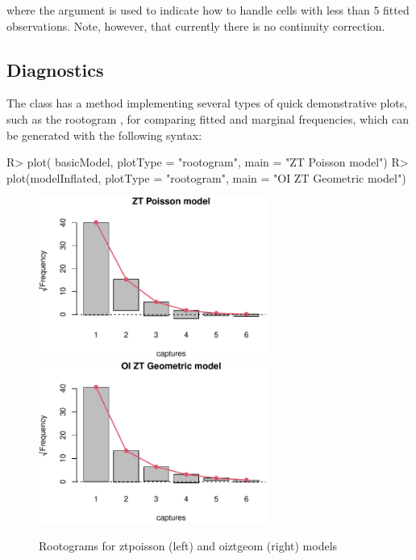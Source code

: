 \documentclass[
]{jss}
\newcommand{\1}{\mathcal{I}} \newcommand{\bZero}{\boldsymbol{0}}
\begin{document}
where the  argument is used to indicate how to handle cells
with less than \(5\) fitted observations. Note, however, that currently
there is no continuity correction.

\subsection{Diagnostics}\label{diagnostics}

The  class has a  method
implementing several types of quick demonstrative plots, such as the
rootogram \citep[cf.][]{rootogram}, for comparing fitted and marginal
frequencies, which can be generated with the following syntax:

\begin{CodeChunk}
\begin{CodeInput}
R> plot(   basicModel, plotType = "rootogram", main = "ZT Poisson model")
R> plot(modelInflated, plotType = "rootogram", main = "OI ZT Geometric model")
\end{CodeInput}
\begin{figure}[ht]

{\centering \includegraphics[width=7.5cm]{singleRcapture_files/figure-latex/rootogram-1} \includegraphics[width=7.5cm]{singleRcapture_files/figure-latex/rootogram-2} 

}

\caption[Rootograms for ztpoisson (left) and oiztgeom (right) models]{Rootograms for ztpoisson (left) and oiztgeom (right) models}\label{fig:rootogram}
\end{figure}
\end{CodeChunk}
\end{document}
